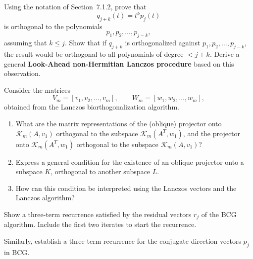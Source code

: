 \documentclass{ctexart}
\newif\ifpreface
\begin{document}
\large
\setlength{\baselineskip}{1.2em}
\ifpreface
    
\newgeometry{left=2cm,right=2cm,top=2cm,bottom=2cm}
\else
{}
\maketitle
\fi
\begin{problem}\label{pro:1}
Using the notation of Section~7.1.2, prove that 
\[
q_{j+k}(t) = t^{k} p_{j}(t)
\]
is orthogonal to the polynomials 
\[
p_1, p_2, \ldots, p_{j-k},
\]
assuming that \( k \leq j \). 
Show that if \( q_{j+k} \) is orthogonalized against 
\( p_1, p_2, \ldots, p_{j-k} \), 
the result would be orthogonal to all polynomials of degree 
\( < j + k \). 
Derive a general \textbf{Look-Ahead non-Hermitian Lanczos procedure} based on this observation.
\end{problem}
\begin{problem}\label{pro:2}
Consider the matrices 
\[
V_m = [v_1, v_2, \ldots, v_m], \qquad 
W_m = [w_1, w_2, \ldots, w_m],
\]
obtained from the Lanczos biorthogonalization algorithm.

\begin{enumerate}
  \item What are the matrix representations of the (oblique) projector onto 
  \(\mathcal{K}_m(A, v_1)\)
  orthogonal to the subspace 
  \(\mathcal{K}_m(A^{T}, w_1)\),
  and the projector onto 
  \(\mathcal{K}_m(A^{T}, w_1)\)
  orthogonal to the subspace 
  \(\mathcal{K}_m(A, v_1)\)?
  
  \item Express a general condition for the existence of an oblique projector onto a subspace 
  \(K\),
  orthogonal to another subspace 
  \(L\).
  
  \item How can this condition be interpreted using the Lanczos vectors and the Lanczos algorithm?
\end{enumerate}
\end{problem}
\begin{problem}\label{pro:3}
Show a three-term recurrence satisfied by the residual vectors \(r_j\) of the BCG algorithm. 
Include the first two iterates to start the recurrence. 

Similarly, establish a three-term recurrence for the conjugate direction vectors \(p_j\) in BCG.
\end{problem}
\end{document}
